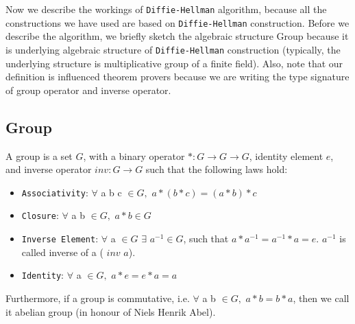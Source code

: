     
    Now we  describe the workings of \texttt{Diffie-Hellman} \citep{Diffie:2006:NDC:2263321.2269104}
    algorithm, because all the constructions we have used  are based on \texttt{Diffie-Hellman} construction. 
    Before we describe the algorithm, we briefly sketch the algebraic structure Group because it is underlying algebraic structure of 
    \texttt{Diffie-Hellman}  construction  (typically, the underlying 
    structure is multiplicative group of a finite field). Also, note that our definition is influenced theorem provers because 
    we are  writing the type signature of group operator and inverse operator. 
    
    \subsection{Group}
    A group is a set $G$, with a binary operator $* : G \rightarrow G \rightarrow G$, identity element $e$, and inverse operator $inv : G \rightarrow G$ such 
    that the following laws hold: 
    \begin{itemize}
     \item \texttt{Associativity}: $\forall$  a b c $\in G,$  $a * (b * c) = (a * b) * c$
    \item \texttt{Closure}: $\forall$ a b $\in G,$  $a * b \in G$
    \item \texttt{Inverse Element}: $\forall$ a $\in G$ $\exists$ $a^{-1} \in G$, such that $a * a^{-1} = a^{-1} * a = e$. $a^{-1}$ is called inverse of a (
     $inv$ $a$).
    \item \texttt{Identity}: $\forall$ a $\in G,$  $a * e = e * a  = a$
    \end{itemize}
   
    \noindent
    Furthermore, if a group is commutative, i.e. 
    $\forall$ a b $\in  G,$  $a * b = b * a$, then we call it abelian group (in honour of Niels Henrik Abel). 
	    
    
     
